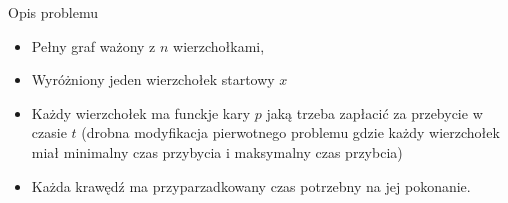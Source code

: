 \begin{block}{Opis problemu}
\begin{itemize}
\item Pełny graf ważony z $n$ wierzchołkami,
\pause
\item Wyróżniony jeden wierzchołek startowy $x$
\pause
\item Każdy wierzchołek ma funckje kary $p$ jaką trzeba zapłacić za przebycie w czasie $t$ (drobna modyfikacja pierwotnego problemu gdzie każdy wierzchołek miał minimalny czas przybycia i maksymalny czas przybcia)
\pause
\item Każda krawędź ma przyparzadkowany czas potrzebny na jej pokonanie.
\end{itemize}
\end{block}
